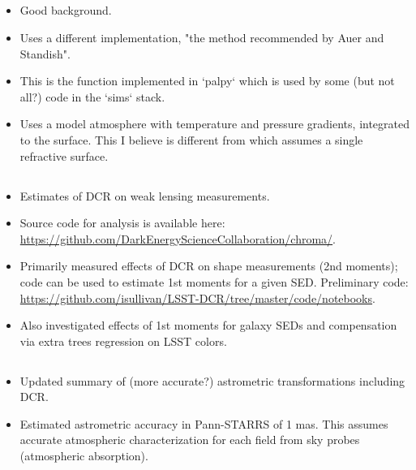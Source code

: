\documentclass[DM,authoryear,toc]{lsstdoc}
\begin{document}
\subsection{\cite{Hohenkerk1985}}
\begin{itemize}
	\item Good background.
	\item Uses a different implementation, "the method recommended by Auer
	and Standish".
	\item This is the function implemented in `palpy` which is used by
	some (but not all?) code in the `sims` stack.
	\item Uses a model atmosphere with temperature and pressure gradients,
	integrated to the surface.  This I believe is different from \cite{Filippenko1982}
	which assumes a single refractive surface.
\end{itemize}

\subsection{\cite{Meyers2015}}

\begin{itemize}
	\item Estimates of DCR on weak lensing measurements.
	\item Source code for analysis is available here:
          \url{https://github.com/DarkEnergyScienceCollaboration/chroma/}.
	\item Primarily measured effects of DCR on shape measurements
          (2nd moments); code can be used to estimate 1st moments for
          a given SED. Preliminary code:
          \url{https://github.com/isullivan/LSST-DCR/tree/master/code/notebooks}.
        \item Also investigated effects of 1st moments for galaxy SEDs
          and compensation via extra trees regression on LSST colors.
\end{itemize}


\subsection{\cite{Chambers2005}}

\begin{itemize}
	\item Updated summary of (more accurate?) astrometric transformations including DCR.
	\item Estimated astrometric accuracy in Pann-STARRS of 1
          mas. This assumes accurate atmospheric characterization for
          each field from sky probes (atmospheric absorption).
\end{itemize}
\end{document}
